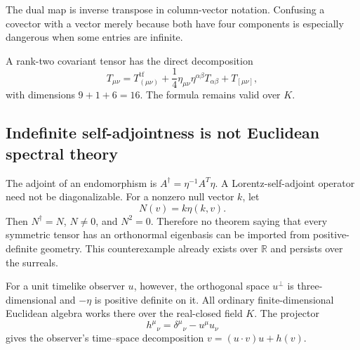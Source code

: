 \documentclass[11pt,letterpaper]{article}
\theoremstyle{definition}
\theoremstyle{remark}
\newcommand{\R}{\mathbb R}\newcommand{\C}{\mathbb C}
\newcommand{\inner}[2]{\eta(#1,#2)}
\begin{document}
The dual map is inverse transpose in column-vector notation. Confusing a covector with a vector merely because both have four components is especially dangerous when some entries are infinite.

A rank-two covariant tensor has the direct decomposition
\begin{equation}
 T_{\mu\nu}=T_{(\mu\nu)}^{\mathrm{tf}}
 +\frac14\eta_{\mu\nu}\eta^{\alpha\beta}T_{\alpha\beta}
 +T_{[\mu\nu]},
\end{equation}
with dimensions $9+1+6=16$. The formula remains valid over $K$.

\subsection{Indefinite self-adjointness is not Euclidean spectral theory}
The adjoint of an endomorphism is $A^\dagger=\eta^{-1}A^T\eta$. A Lorentz-self-adjoint operator need not be diagonalizable. For a nonzero null vector $k$, let
\begin{equation}\label{vtf:mink:eq:nullnilpotent}
 N(v)=k\inner{k}{v}.
\end{equation}
Then $N^\dagger=N$, $N\ne0$, and $N^2=0$. Therefore no theorem saying that every symmetric tensor has an orthonormal eigenbasis can be imported from positive-definite geometry. This counterexample already exists over $\R$ and persists over the surreals.

For a unit timelike observer $u$, however, the orthogonal space $u^\perp$ is three-dimensional and $-\eta$ is positive definite on it. All ordinary finite-dimensional Euclidean algebra works there over the real-closed field $K$. The projector
\begin{equation}
 h^\mu{}_\nu=\delta^\mu{}_\nu-u^\mu u_\nu
\end{equation}
gives the observer's time--space decomposition
$v=(u\cdot v)u+h(v)$.
\end{document}
